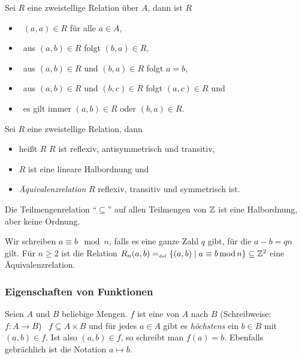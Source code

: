 \begin{definition}
Sei $R$ eine zweistellige Relation über $A$, dann ist $R$
\begin{itemize}
%
\item {} \gdw \ $(a,a) \in R$ für alle $a \in A$,
%
\item {} \gdw \ aus $(a,b) \in R$ folgt $(b,a) \in R$,
%
\item {} \gdw \ aus $(a,b) \in R$ und $(b,a) \in R$ folgt $a =
b$,
%
\item {} \gdw \ aus $(a,b) \in R$ und $(b,c) \in R$ folgt $(a,c)
\in R$ und 
%
\item {} \gdw \ es gilt immer $(a,b) \in R$ oder $(b, a) \in R$.
%
\end{itemize}
\end{definition}

\begin{definition}
Sei $R$ eine zweistellige Relation, dann
\begin{itemize}
%
\item heißt $R$  \gdw $R$ ist reflexiv,
antisymmetrisch und transitiv,
%
\item {} \gdw $R$ ist eine lineare Halbordnung und
%
\item \emph{Äquivalenzrelation} 
\gdw $R$ reflexiv, transitiv und symmetrisch ist.
%
\end{itemize}
\end{definition}
\goodbreak

\begin{example}
Die Teilmengenrelation "`$\subseteq$"' auf allen Teilmengen von $\mathbb Z$ ist
eine Halbordnung, aber keine Ordnung. 
\end{example}
\goodbreak

\begin{example}
	Wir schreiben $a \equiv b \mod n$\index{$\equiv$}, falls es eine ganze Zahl $q$ gibt, für die $a - b = q n$ gilt. Für $n \ge 2$ ist die Relation $R_n(a,b) =_{\mathrm{\scriptscriptstyle def}} \{(a,b) \mid a \equiv b \mathrm{\,mod\,} n\} \subseteq \mathbb Z^2$ eine Äquivalenzrelation.
\end{example}

\subsubsection{Eigenschaften von Funktionen}
\label{PropFunc}
Seien $A$ und $B$ beliebige Mengen. $f$ ist eine  von $A$ nach
$B$ (Schreibweise: $f \colon A \rightarrow B$) \gdw \ $f \subseteq A \times
B$ und für jedes $a \in A$ gibt es \emph{höchstens} ein $b \in B$ mit
$(a, b) \in f$. Ist also $(a,b) \in f$, so schreibt man $f(a) =
b$. Ebenfalls gebrächlich ist die Notation $a \mapsto b$.

